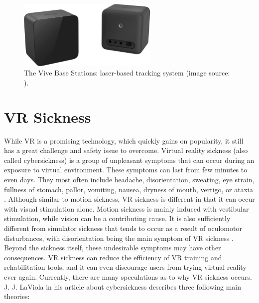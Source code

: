 \begin{figure}[th]
\centering
\includegraphics[width=0.6\textwidth]{img/base_stations.png}
\caption{The Vive Base Stations: laser-based tracking system (image source: \cite{VIVE}).}
\label{fig:BASE_STATIONS}
\end{figure}

\section{VR Sickness}

While VR is a promising technology, which quickly gains on popularity, it still has a great challenge and safety issue to overcome. Virtual reality sickness (also called cybersickness) is a group of unpleasant symptoms that can occur during an exposure to virtual environment. These symptoms can last from few minutes to even days. They most often include headache, disorientation, sweating, eye strain, fullness of stomach, pallor, vomiting, nausea, dryness of mouth, vertigo, or ataxia \cite{VRSYMPTOMSTIME}. Although similar to motion sickness, VR sickness is different in that it can occur with visual stimulation alone. Motion sickness is mainly induced with vestibular stimulation, while vision can be a contributing cause. It is also sufficiently different from simulator sickness that tends to occur as a result of oculomotor disturbances, with disorientation being the main symptom of VR sickness \cite{VRANDSIMULATORSICKNESS}. Beyond the sickness itself, these undesirable symptoms may have other consequences. VR sickness can reduce the efficiency of VR training and rehabilitation tools, and it can even discourage users from trying virtual reality ever again. Currently, there are many speculations as to why VR sickness occurs. J. J. LaViola in his article about cybersickness \cite{VRSYMPTOMS} describes three following main theories: 

